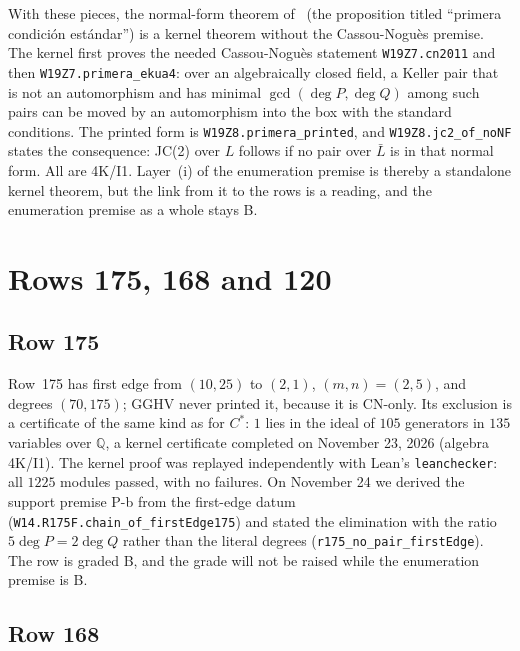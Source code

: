 \documentclass[a4paper,11pt]{article}
\theoremstyle{jsplain}
\theoremstyle{jsdef}
\theoremstyle{jsrem}
\begin{document}
With these pieces, the normal-form theorem of~\cite{GGV1} (the proposition titled ``primera condici\'on est\'andar'') is a kernel theorem without the Cassou-Nogu\`es premise. The kernel first proves the needed Cassou-Nogu\`es statement \texttt{W19Z7.\allowbreak{}cn2011} and then \texttt{W19Z7.\allowbreak{}primera\_\allowbreak{}ekua4}: over an algebraically closed field, a Keller pair that is not an automorphism and has minimal $\gcd(\deg P,\deg Q)$ among such pairs can be moved by an automorphism into the box with the standard conditions. The printed form is \texttt{W19Z8.\allowbreak{}primera\_\allowbreak{}printed}, and \texttt{W19Z8.\allowbreak{}jc2\_\allowbreak{}of\_\allowbreak{}noNF} states the consequence: JC(2) over $L$ follows if no pair over $\bar L$ is in that normal form. All are 4K/I1. Layer~(i) of the enumeration premise is thereby a standalone kernel theorem, but the link from it to the rows is a reading, and the enumeration premise as a whole stays B.

\section{Rows 175, 168 and 120}\label{rp:sec:rowsdetail}

\subsection{Row 175}

Row~175 has first edge from $(10,25)$ to $(2,1)$, $(m,n)=(2,5)$, and degrees $(70,175)$; GGHV never printed it, because it is CN-only. Its exclusion is a certificate of the same kind as for $C^*$: $1$ lies in the ideal of $105$ generators in $135$ variables over $\mathbb Q$, a kernel certificate completed on November 23, 2026 (algebra 4K/I1). The kernel proof was replayed independently with Lean's \texttt{leanchecker}: all $1225$ modules passed, with no failures. On November 24 we derived the support premise P-b from the first-edge datum (\texttt{W14.\allowbreak{}R175F.\allowbreak{}chain\_\allowbreak{}of\_\allowbreak{}firstEdge175}) and stated the elimination with the ratio $5\deg P=2\deg Q$ rather than the literal degrees (\texttt{r175\_\allowbreak{}no\_\allowbreak{}pair\_\allowbreak{}firstEdge}). The row is graded B, and the grade will not be raised while the enumeration premise is B.

\subsection{Row 168}
\end{document}
